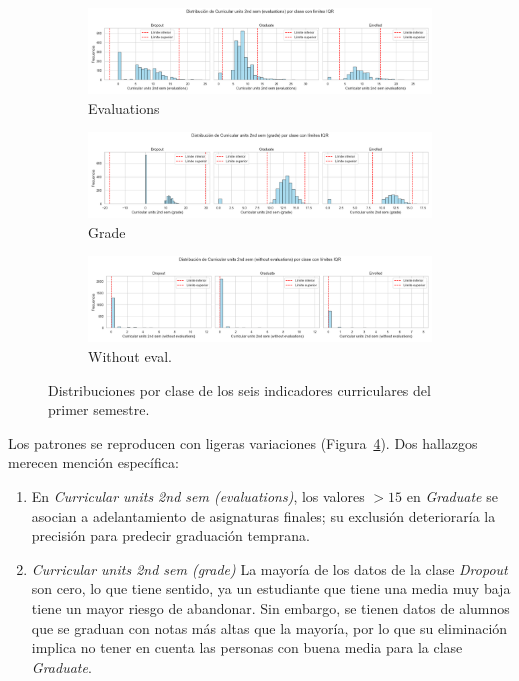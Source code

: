 \documentclass{report}[14pt]
\begin{document}
\begin{figure}[htbp]
  \begin{subfigure}[b]{.32\linewidth}
    \includegraphics[width=\linewidth]{distribution/Curricular units 2nd sem (evaluations)_distribution.png}
    \caption{Evaluations}\label{fig:evaluations2}
  \end{subfigure}\hfill
  \begin{subfigure}[b]{.32\linewidth}
    \includegraphics[width=\linewidth]{distribution/Curricular units 2nd sem (grade)_distribution.png}
    \caption{Grade}\label{fig:grade2}
  \end{subfigure}\hfill
  \begin{subfigure}[b]{.32\linewidth}
    \includegraphics[width=\linewidth]{distribution/Curricular units 2nd sem (without evaluations)_distribution.png}
    \caption{Without eval.}\label{fig:witheval2}
  \end{subfigure}

  \caption{Distribuciones por clase de los seis indicadores curriculares del primer semestre.}
  \label{fig:curricular-2s}
\end{figure}


\FloatBarrier
Los patrones se reproducen con ligeras variaciones (Figura~\ref{fig:curricular-2s}).  Dos hallazgos merecen mención específica:
\begin{enumerate}[label=(\alph*)]
\item En \textit{Curricular units 2nd sem (evaluations)}, los valores $>15$ en \textit{Graduate} se asocian a adelantamiento de asignaturas finales; su exclusión deterioraría la precisión para predecir graduación temprana.
\item \textit{Curricular units 2nd sem (grade)} La mayoría de los datos de la clase \textit{Dropout} son cero, lo que tiene sentido, ya un estudiante que tiene una media muy baja tiene un mayor riesgo de abandonar. Sin embargo, se tienen datos de alumnos que se graduan con notas más altas que la mayoría, por lo que su eliminación implica no tener en cuenta las personas con buena media para la clase \textit{Graduate}.
\end{enumerate}
\end{document}
